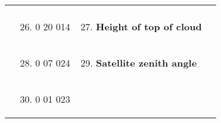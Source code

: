 \begin{longtable}[]{@{}llll@{}}
\begin{minipage}[t]{0.22\columnwidth}
\strut
\end{minipage}\tabularnewline
\begin{minipage}[t]{0.22\columnwidth}\raggedright
\strut
\end{minipage} & \begin{minipage}[t]{0.22\columnwidth}\raggedright
\begin{enumerate}
\setcounter{enumi}{25}
\item
  0 20 014
\end{enumerate}\strut
\end{minipage} & \begin{minipage}[t]{0.22\columnwidth}\raggedright
\begin{enumerate}
\setcounter{enumi}{26}
\item
  \textbf{Height of top of cloud}
\end{enumerate}\strut
\end{minipage} & \begin{minipage}[t]{0.22\columnwidth}\raggedright
\strut
\end{minipage}\tabularnewline
\begin{minipage}[t]{0.22\columnwidth}\raggedright
\strut
\end{minipage} & \begin{minipage}[t]{0.22\columnwidth}\raggedright
\begin{enumerate}
\setcounter{enumi}{27}
\item
  0 07 024
\end{enumerate}\strut
\end{minipage} & \begin{minipage}[t]{0.22\columnwidth}\raggedright
\begin{enumerate}
\setcounter{enumi}{28}
\item
  \textbf{Satellite zenith angle}
\end{enumerate}\strut
\end{minipage} & \begin{minipage}[t]{0.22\columnwidth}\raggedright
\strut
\end{minipage}\tabularnewline
\begin{minipage}[t]{0.22\columnwidth}\raggedright
\strut
\end{minipage} & \begin{minipage}[t]{0.22\columnwidth}\raggedright
\begin{enumerate}
\setcounter{enumi}{29}
\item
  0 01 023
\end{enumerate}\strut
\end{minipage} & \begin{minipage}[t]{0.22\columnwidth}\raggedright

\end{minipage}
\end{longtable}

